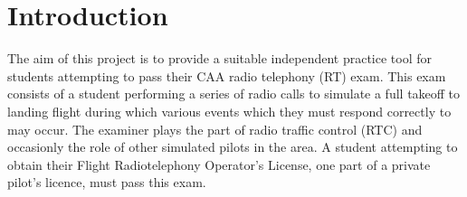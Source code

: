 \section{Introduction}

The aim of this project is to provide a suitable independent practice tool for students attempting to pass their CAA radio telephony (RT) exam.
This exam consists of a student performing a series of radio calls to simulate a full takeoff to landing flight during which various events which they must respond correctly to may occur.
The examiner plays the part of radio traffic control (RTC) and occasionly the role of other simulated pilots in the area.
A student attempting to obtain their Flight Radiotelephony Operator's License, one part of a private pilot's licence, must pass this exam.